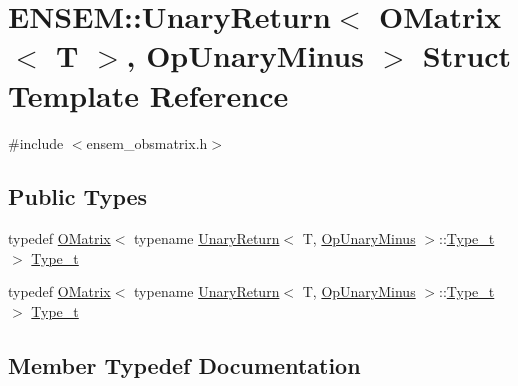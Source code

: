 \hypertarget{structENSEM_1_1UnaryReturn_3_01OMatrix_3_01T_01_4_00_01OpUnaryMinus_01_4}{}\section{E\+N\+S\+EM\+:\+:Unary\+Return$<$ O\+Matrix$<$ T $>$, Op\+Unary\+Minus $>$ Struct Template Reference}
\label{structENSEM_1_1UnaryReturn_3_01OMatrix_3_01T_01_4_00_01OpUnaryMinus_01_4}


{\ttfamily \#include $<$ensem\+\_\+obsmatrix.\+h$>$}

\subsection*{Public Types}
\begin{DoxyCompactItemize}
\item 
typedef \mbox{\hyperlink{classENSEM_1_1OMatrix}{O\+Matrix}}$<$ typename \mbox{\hyperlink{structENSEM_1_1UnaryReturn}{Unary\+Return}}$<$ T, \mbox{\hyperlink{structENSEM_1_1OpUnaryMinus}{Op\+Unary\+Minus}} $>$\+::\mbox{\hyperlink{structENSEM_1_1UnaryReturn_3_01OMatrix_3_01T_01_4_00_01OpUnaryMinus_01_4_a7ee85b64d167dda62c67b1c0e963de96}{Type\+\_\+t}} $>$ \mbox{\hyperlink{structENSEM_1_1UnaryReturn_3_01OMatrix_3_01T_01_4_00_01OpUnaryMinus_01_4_a7ee85b64d167dda62c67b1c0e963de96}{Type\+\_\+t}}
\item 
typedef \mbox{\hyperlink{classENSEM_1_1OMatrix}{O\+Matrix}}$<$ typename \mbox{\hyperlink{structENSEM_1_1UnaryReturn}{Unary\+Return}}$<$ T, \mbox{\hyperlink{structENSEM_1_1OpUnaryMinus}{Op\+Unary\+Minus}} $>$\+::\mbox{\hyperlink{structENSEM_1_1UnaryReturn_3_01OMatrix_3_01T_01_4_00_01OpUnaryMinus_01_4_a7ee85b64d167dda62c67b1c0e963de96}{Type\+\_\+t}} $>$ \mbox{\hyperlink{structENSEM_1_1UnaryReturn_3_01OMatrix_3_01T_01_4_00_01OpUnaryMinus_01_4_a7ee85b64d167dda62c67b1c0e963de96}{Type\+\_\+t}}
\end{DoxyCompactItemize}


\subsection{Member Typedef Documentation}
\mbox{\label{structENSEM_1_1UnaryReturn_3_01OMatrix_3_01T_01_4_00_01OpUnaryMinus_01_4_a7ee85b64d167dda62c67b1c0e963de96}} 
